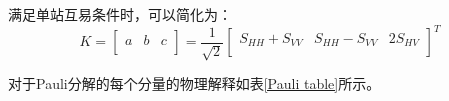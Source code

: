 \documentclass[promaster]{thesis-uestc}
\begin{document}
满足单站互易条件时，可以简化为：
\begin{equation}
    K=\left[ \begin{matrix}
            a & b & c \\
        \end{matrix} \right] =\frac{1}{\sqrt{2}}\left[ \begin{matrix}
            S_{HH}+S_{VV} & S_{HH}-S_{VV} & 2S_{HV} \\
        \end{matrix} \right] ^T
\end{equation}

对于Pauli分解的每个分量的物理解释如表\ref{Pauli table}所示。
\begin{table}[h]
    \caption{Pauli分解}
    \linespread{1.5} %
    \setlength{\arraycolsep}{10pt} %


    \label{Pauli table}
\end{table}
\end{document}
